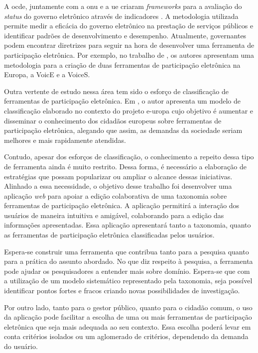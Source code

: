 \par
A \acrfull{ocde}, juntamente com a \acrshort{onu} e a \acrfull{ue} criaram \textit{frameworks} para a avaliação do \textit{status} do governo eletrônico através de indicadores \cite{onu2018}. A metodologia utilizada permite medir a eficácia do governo eletrônico na prestação de serviços públicos e identificar padrões de desenvolvimento e desempenho.
Atualmente, governantes podem encontrar diretrizes para seguir na hora de desenvolver uma ferramenta de participação eletrônica. 
Por exemplo,  no trabalho de , os autores apresentam uma metodologia para a criação de duas ferramentas de participação eletrônica na Europa, a VoicE e a VoiceS.

Outra vertente de estudo nessa área tem sido o esforço de classificação de ferramentas de participação eletrônica. Em  , o autor apresenta um modelo de classificação elaborado no contexto do projeto \acrfull{e-uropa} cujo objetivo é aumentar e disseminar o conhecimento dos cidadãos europeus sobre ferramentas de participação eletrônica, alegando que assim, as demandas da sociedade seriam melhores e mais rapidamente atendidas.
\par
Contudo, apesar dos esforços de classificação, o conhecimento a repeito dessa tipo de ferramenta ainda é muito restrito. Dessa forma, é necessário a elaboração de estratégias que possam popularizar ou ampliar o alcance dessas iniciativas. 
Alinhado a essa necessidade, o objetivo desse trabalho foi desenvolver uma aplicação \textit{web} para apoiar a edição colaborativa de uma taxonomia sobre ferramentas
de participação eletrônica. A aplicação permitirá a interação dos usuários de maneira intuitiva e amigável, colaborando para a edição das informações apresentadas.
Essa aplicação apresentará tanto a taxonomia, quanto as ferramentas de participação eletrônica classificadas pelos usuários.

Espera-se construir uma ferramenta que contribua tanto para a pesquisa quanto para a prática do assunto abordado. No que diz respeito à pesquisa, a ferramenta pode ajudar os pesquisadores a entender mais sobre domínio. 
Espera-se que com a utilização de um modelo sistemático representado pela taxonomia, seja possível identificar pontos fortes e fracos criando novas possibilidades de investigação.
\par
Por outro lado, tanto para o gestor público, quanto para o cidadão comum, o uso da aplicação pode facilitar a escolha de uma ou mais ferramentas de participação
eletrônica que seja mais adequada ao seu contexto. Essa escolha poderá levar em conta critérios isolados ou um aglomerado de critérios, dependendo da demanda do usuário.
